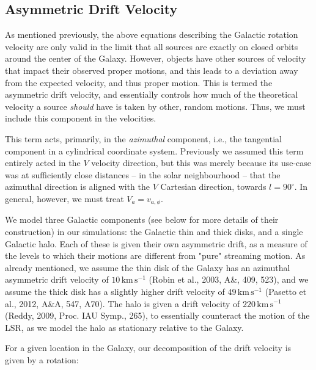 \documentclass[fleqn,usenatbib]{mnras}
\begin{document}
\subsection{Asymmetric Drift Velocity}
As mentioned previously, the above equations describing the Galactic rotation velocity are only valid in the limit that all sources are exactly on closed orbits around the center of the Galaxy.
However, objects have other sources of velocity that impact their observed proper motions, and this leads to a deviation away from the expected velocity, and thus proper motion.
This is termed the asymmetric drift velocity, and essentially controls how much of the theoretical velocity a source \textit{should} have is taken by other, random motions.
Thus, we must include this component in the velocities.

This term acts, primarily, in the \textit{azimuthal} component, i.e., the tangential component in a cylindrical coordinate system.
Previously we assumed this term entirely acted in the $V$ velocity direction, but this was merely because its use-case was at sufficiently close distances -- in the solar neighbourhood -- that the azimuthal direction is aligned with the $V$ Cartesian direction, towards $l = 90^\circ$.
In general, however, we must treat $V_a = v_{a,\phi}$.

We model three Galactic components (see below for more details of their construction) in our simulations: the Galactic thin and thick disks, and a single Galactic halo.
Each of these is given their own asymmetric drift, as a measure of the levels to which their motions are different from "pure" streaming motion.
As already mentioned, we assume the thin disk of the Galaxy has an azimuthal asymmetric drift velocity of $10\,\mathrm{km}\,\mathrm{s}^{-1}$ (Robin et al., 2003, A\&, 409, 523), and we assume the thick disk has a slightly higher drift velocity of $49\,\mathrm{km}\,\mathrm{s}^{-1}$ (Pasetto et al., 2012, A\&A, 547, A70).
The halo is given a drift velocity of $220\,\mathrm{km}\,\mathrm{s}^{-1}$ (Reddy, 2009, Proc. IAU Symp., 265), to essentially counteract the motion of the LSR, as we model the halo as stationary relative to the Galaxy.

For a given location in the Galaxy, our decomposition of the drift velocity is given by a rotation:
\end{document}
